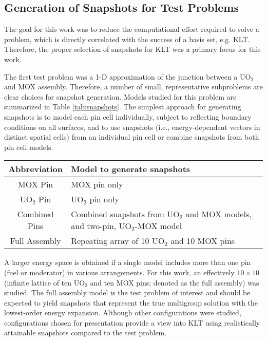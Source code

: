 \documentclass[5p,times,twocolumn,10pt]{elsarticle}
\begin{document}
    \subsection{Generation of Snapshots for Test Problems}
    
    The goal for this work was to reduce the computational effort 
    required to solve a problem, which is directly correlated with the success 
    of a basis set, e.g. KLT.  Therefore, the proper selection of snapshots for 
    KLT was a primary focus for this work. 
    
    The first test problem was a 1-D approximation of the junction between a 
    UO$_2$ and MOX assembly. Therefore, a number of small, representative 
    subproblems are clear choices for snapshot generation. Models studied for 
    this problem are summarized in Table \ref{tab:snapshots}. The simplest 
    approach for generating snapshots is to model each pin cell individually, 
    subject to reflecting boundary conditions on all surfaces, and to use 
    snapshots (i.e., energy-dependent vectors in distinct spatial cells) from 
    an individual pin cell or combine snapshots from both pin cell models.  
    
    \begin{table*}[htb]
        \centering
        \caption{Summary of models used for snapshot generation for 10-pin test 
            case}
        \begin{tabular}{c | l}\toprule
            Abbreviation    & Model to generate snapshots \\ \midrule
            MOX Pin         & MOX pin only \\
            UO$_2$ Pin      & UO$_2$ pin only \\
            Combined Pins   & Combined snapshots from UO$_2$ and MOX models, 
and 
            two-pin, UO$_2$-MOX model \\
            Full Assembly   & Repeating array of 10 UO$_2$ and 10 MOX pins \\
            \bottomrule
        \end{tabular}
        \label{tab:snapshots}
    \end{table*}
    
    A larger energy space is obtained if a single model includes more than one 
    pin (fuel or moderator) in various arrangements.  For this work, an 
    effectively $10\times 10$ (infinite lattice of ten UO$_2$ and ten MOX pins; 
    denoted as the full assembly) was studied.  The full assembly model is the 
    test problem of interest and should be expected to yield snapshots that 
    represent the true multigroup solution with the lowest-order energy 
    expansion.  Although other configurations were studied, configurations 
    chosen for presentation provide a view into KLT using realistically 
    attainable snapshots compared to the test problem.
    
\end{document}
